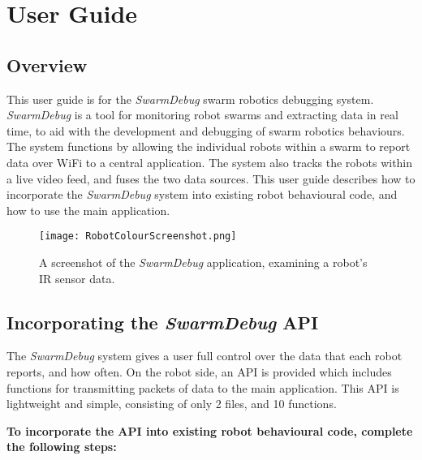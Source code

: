 \chapter{User Guide}

\label{AppendixUserGuide}

\section{Overview}

This user guide is for the \textit{SwarmDebug} swarm robotics debugging system. \textit{SwarmDebug} is a tool for monitoring robot swarms and extracting data in real time, to aid with the development and debugging of swarm robotics behaviours. The system functions by allowing the individual robots within a swarm to report data over WiFi to a central application. The system also tracks the robots within a live video feed, and fuses the two data sources. This user guide describes how to incorporate the \textit{SwarmDebug} system into existing robot behavioural code, and how to use the main application.

\begin{figure}[h]
 \begin{center}
 \texttt{[image: RobotColourScreenshot.png]}
 \decoRule
 \caption[The \textit{SwarmDebug} Application]{A screenshot of the \textit{SwarmDebug} application, examining a robot's IR sensor data.}
 \label{fig:RobotColourScreenshot}
 \end{center}
\end{figure}

\section{Incorporating the \textit{SwarmDebug} API}

The \textit{SwarmDebug} system gives a user full control over the data that each robot reports, and how often. On the robot side, an API is provided which includes functions for transmitting packets of data to the main application. This API is lightweight and simple, consisting of only 2 files, and 10 functions. 

\noindent \textbf{To incorporate the API into existing robot behavioural code, complete the following steps:}


